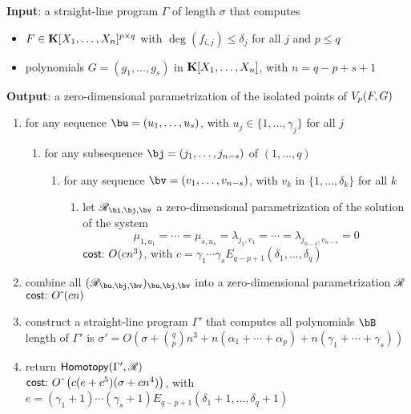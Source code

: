 \documentclass[12pt]{article}
\begin{document}
\begin{algorithm}
\caption{$\mathsf{ColumnDegree}(\Gamma)$}
{\bf Input}: a straight-line program $\Gamma$ of length $\sigma$ that computes 
\begin{itemize}  
\setlength\itemsep{0em}
\item $F \in \mathbf{K}[X_1, \ldots, X_n]^{p \times q}$ with $\deg(f_{i,j}) \leq \delta_j$ for all $j$ and $p \le q$
\item polynomials $G = (g_1, \ldots, g_s)$ in $\mathbf{K}[X_1, \ldots, X_n]$, with $n=q-p+s+1$
\end{itemize}
{\bf Output}: a zero-dimensional parametrization of the isolated points of $V_{p}({F},G)$
\begin{enumerate}\setlength\itemsep{0em}
\item for any sequence $\bu=(u_1,\dots,u_s)$, with $u_j \in \{1,\dots,\gamma_j\}$ for all $j$
\begin{enumerate}\setlength\itemsep{0em}
\item for any subsequence $\bj=(j_1,\dots,j_{n-s})$ of $(1,\dots,q)$
\begin{enumerate}\setlength\itemsep{0em}
\item for any sequence $\bv=(v_1,\dots,v_{n-s})$, with $v_k$ in $\{1,\dots,\delta_k\}$ for all $k$
\begin{enumerate}\setlength\itemsep{0em}
 \item let $\scrR_{\bi,\bj,\bv}$ a zero-dimensional parametrization of the solution of the system 
$$\mu_{1,u_1}=\cdots=\mu_{s,u_s}=\lambda_{j_1,v_1}=\cdots=\lambda_{j_{n-s},v_{n-s}}=0$$
$\text{\sf{cost:~}} O(cn^3)$, with $c=\gamma_1\cdots\gamma_s E_{q-p+1}(\delta_1,\dots,\delta_q)$
\end{enumerate}
\end{enumerate}
\end{enumerate}
\item combine all $(\scrR_{\bu,\bj,\bv})_{\bu,\bj,\bv}$ into a zero-dimensional parametrization $\mathscr{R}$\\
$\text{\sf{cost:~}} {O}{\,\tilde{ }\,}(cn)$

\item construct a straight-line program $\Gamma'$ that computes all polynomials $\bB$\\
  length of $\Gamma'$ is $\sigma'=O(\sigma + {q \choose p} n^3 + n
(\alpha_1+\cdots+\alpha_p) + n(\gamma_1 + \cdots + \gamma_s))$

\item return $\mathsf{Homotopy}(\Gamma',\mathscr{R})$ \\
$\text{\sf{cost:~}} {O}{\,\tilde{ }\,}\left (c(e+c^5 )(\sigma + cn^4)\right)$, 
with $e=(\gamma_1+1)\cdots(\gamma_s+1) E_{q-p+1}(\delta_1+1,\dots,\delta_q+1)$
\end{enumerate}
\label{ColHom}
\end{algorithm}
\end{document}
